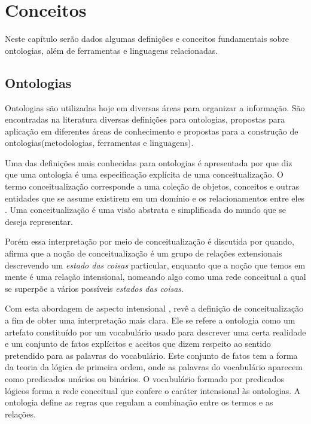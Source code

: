 \chapter{Conceitos}
\label{cap:conceitos}

Neste capítulo serão dados algumas definições e conceitos fundamentais sobre
ontologias, além de ferramentas e linguagens relacionadas.

\section{Ontologias}
\label{sec:definicao}

Ontologias são utilizadas hoje em diversas áreas para organizar a informação.
São encontradas na literatura diversas definições para ontologias, propostas
para aplicação em diferentes áreas de conhecimento e propostas para a construção
de ontologias(metodologias, ferramentas e linguagens).

Uma das definições mais conhecidas para ontologias é apresentada por
\cite{gruber1995toward} que diz que uma ontologia é uma especificação explícita
de uma conceitualização. O termo conceitualização corresponde a uma coleção de
objetos, conceitos e outras entidades que se assume existirem em um domínio e
os relacionamentos entre eles \cite{genesereth1987logical}. Uma conceitualização
é uma visão abstrata e simplificada do mundo que se deseja representar.

Porém essa interpretação por meio de conceitualização é discutida por
\cite{giaretta1995ontologies} quando, afirma que a noção de conceitualização é um
grupo de relações extensionais descrevendo um {\it estado das coisas} particular,
enquanto que a noção que temos em mente é uma relação intensional, nomeando algo
como uma rede conceitual a qual se superpõe a vários possíveis
{\it estados das coisas}.

Com esta abordagem de aspecto intensional \cite{guarino1998formal}, revê a
definição de conceitualização a fim de obter uma interpretação mais clara. Ele
se refere a ontologia como um artefato constituído por um vocabulário usado para
descrever uma certa realidade e um conjunto de fatos explícitos e aceitos
que dizem respeito ao sentido pretendido para as palavras do vocabulário. Este
conjunto de fatos tem a forma da teoria da lógica de primeira ordem, onde as
palavras do vocabulário aparecem como predicados unários ou binários. O
vocabulário formado por predicados lógicos forma a rede conceitual que confere
o caráter intensional às ontologias. A ontologia define as regras que regulam a
combinação entre os termos e as relações.

